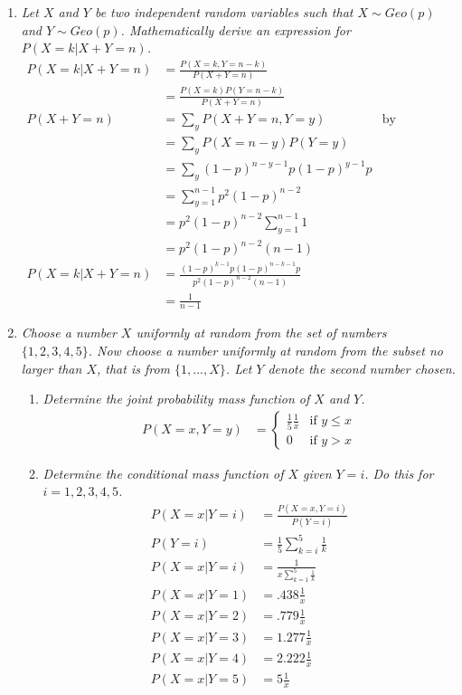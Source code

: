 \documentclass{article} %
\begin{document}
\begin{enumerate}
	\item \textit{Let $X$ and $Y$ be two independent random variables such that $X \sim Geo(p)$ and $Y \sim Geo(p)$. Mathematically derive an expression for $P(X = k | X + Y = n)$.}
	\begin{align*}
	P(X = k | X + Y = n) &= \frac{P(X = k, Y = n - k)}{P(X + Y = n)}\\
	&= \frac{P(X = k)P(Y = n - k)}{P(X + Y = n)}\\
	P(X + Y = n) &= \sum_{y} P(X + Y = n, Y = y) &\text{by convolution}\\
	&= \sum_{y} P(X = n - y)P(Y = y)\\
	&= \sum_{y} (1 - p)^{n-y-1}p(1 - p)^{y-1}p\\
	&= \sum_{y=1}^{n-1} p^2(1 - p)^{n-2}\\
	&= p^2(1 - p)^{n-2} \sum_{y=1}^{n-1} 1\\
	&= p^2(1 - p)^{n-2}(n - 1)\\
	P(X = k | X + Y = n) &= \frac{(1 - p)^{k-1}p(1 - p)^{n-k-1}p}{p^2(1 - p)^{n-2}(n - 1)}\\
	&= \frac{1}{n - 1}
	\end{align*}
	
	\item \textit{Choose a number $X$ uniformly at random from the set of numbers $\{1, 2, 3, 4, 5\}$. Now choose a number uniformly at random from the subset no larger than $X$, that is from $\{1, ..., X\}$. Let $Y$ denote the second number chosen.}
	\begin{enumerate}
		\item \textit{Determine the joint probability mass function of $X$ and $Y$.}
		\begin{align*}
		P(X = x, Y = y) &=
		\begin{cases}
		\frac{1}{5}\frac{1}{x} &\text{if } y \leq x\\
		0 &\text{if } y > x
		\end{cases}
		\end{align*}
		
		\item \textit{Determine the conditional mass function of $X$ given $Y = i$. Do this for $i = 1, 2, 3, 4, 5$.}
		\begin{align*}
		P(X = x | Y = i) &= \frac{P(X = x, Y = i)}{P(Y = i)}\\
		P(Y = i) &= \frac{1}{5} \sum_{k = i}^{5} \frac{1}{k}\\
		P(X = x | Y = i) &= \frac{1}{x \sum_{k = 1}^{5} \frac{1}{k}}\\
		P(X = x | Y = 1) &= .438 \frac{1}{x}\\
		P(X = x | Y = 2) &= .779 \frac{1}{x}\\
		P(X = x | Y = 3) &= 1.277 \frac{1}{x}\\
		P(X = x | Y = 4) &= 2.222 \frac{1}{x}\\
		P(X = x | Y = 5) &= 5 \frac{1}{x}
		\end{align*}
		

\end{enumerate}
\end{enumerate}
\end{document}
